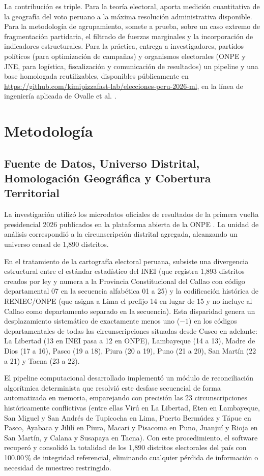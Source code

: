\documentclass[conference,10pt,letterpaper]{IEEEtran}
\begin{document}
La contribución es triple. Para la teoría electoral, aporta medición cuantitativa de la geografía del voto peruano a la máxima resolución administrativa disponible. Para la metodología de agrupamiento, somete a prueba, sobre un caso extremo de fragmentación partidaria, el filtrado de fuerzas marginales y la incorporación de indicadores estructurales. Para la práctica, entrega a investigadores, partidos políticos (para optimización de campañas) y organismos electorales (ONPE y JNE, para logística, fiscalización y comunicación de resultados) un pipeline y una base homologada reutilizables, disponibles públicamente en \url{https://github.com/kimipizzafast-lab/elecciones-peru-2026-ml}, en la línea de ingeniería aplicada de Ovalle et al. \cite{ovalle2024, ovalle2026_laccei}.

\section{Metodología}

\subsection{Fuente de Datos, Universo Distrital, Homologación Geográfica y Cobertura Territorial}

La investigación utilizó los microdatos oficiales de resultados de la primera vuelta presidencial 2026 publicados en la plataforma abierta de la ONPE \cite{onpe2026_resultados_web}. La unidad de análisis correspondió a la circunscripción distrital agregada, alcanzando un universo censal de 1,890 distritos.

En el tratamiento de la cartografía electoral peruana, subsiste una divergencia estructural entre el estándar estadístico del INEI \cite{inei2026_directorio} (que registra 1,893 distritos creados por ley y numera a la Provincia Constitucional del Callao con código departamental 07 en la secuencia alfabética 01 a 25) y la codificación histórica de RENIEC/ONPE (que asigna a Lima el prefijo 14 en lugar de 15 y no incluye al Callao como departamento separado en la secuencia). Esta disparidad genera un desplazamiento sistemático de exactamente menos uno ($-1$) en los códigos departamentales de todas las circunscripciones situadas desde Cusco en adelante: La Libertad (13 en INEI pasa a 12 en ONPE), Lambayeque (14 a 13), Madre de Dios (17 a 16), Pasco (19 a 18), Piura (20 a 19), Puno (21 a 20), San Martín (22 a 21) y Tacna (23 a 22).

El pipeline computacional desarrollado implementó un módulo de reconciliación algorítmica determinista que resolvió este desfase secuencial de forma automatizada en memoria, emparejando con precisión las 23 circunscripciones históricamente conflictivas (entre ellas Virú en La Libertad, Eten en Lambayeque, San Miguel y San Andrés de Tupicocha en Lima, Puerto Bermúdez y Tápuc en Pasco, Ayabaca y Jililí en Piura, Macari y Pisacoma en Puno, Juanjuí y Rioja en San Martín, y Calana y Susapaya en Tacna). Con este procedimiento, el software recuperó y consolidó la totalidad de los 1,890 distritos electorales del país con 100.00\,\% de integridad referencial, eliminando cualquier pérdida de información o necesidad de muestreo restringido.
\end{document}
